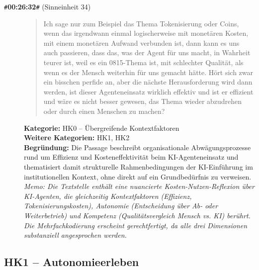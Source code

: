 \begin{description}
  \item[\texttt{\#}\textbf{00:26:32}\texttt{\#} (Sinneinheit 34)]
  \begin{quote}
  Ich sage nur zum Beispiel das Thema Tokenisierung oder Coins, wenn das irgendwann einmal logischerweise mit monetären Kosten, mit einem monetären Aufwand verbunden ist, dann kann es uns auch passieren, dass das, was der Agent für uns macht, in Wahrheit teurer ist, weil es ein 0815-Thema ist, mit schlechter Qualität, als wenn es der Mensch weiterhin für uns gemacht hätte. Hört sich zwar ein bisschen perfide an, aber die nächste Herausforderung wird dann werden, ist dieser Agenteneinsatz wirklich effektiv und ist er effizient und wäre es nicht besser gewesen, das Thema wieder abzudrehen oder durch einen Menschen zu machen?
  \end{quote}
  \textbf{Kategorie:} HK0 -- Übergreifende Kontextfaktoren\\
  \textbf{Weitere Kategorien:} HK1, HK2\\
  \textbf{Begr\"undung:} Die Passage beschreibt organisationale Abwägungsprozesse rund um Effizienz und Kosteneffektivität beim KI-Agenteneinsatz und thematisiert damit strukturelle Rahmenbedingungen der KI-Einführung im institutionellen Kontext, ohne direkt auf ein Grundbedürfnis zu verweisen.
  \\\textit{Memo: Die Textstelle enthält eine nuancierte Kosten-Nutzen-Reflexion über KI-Agenten, die gleichzeitig Kontextfaktoren (Effizienz, Tokenisierungskosten), Autonomie (Entscheidung über Ab- oder Weiterbetrieb) und Kompetenz (Qualitätsvergleich Mensch vs. KI) berührt. Die Mehrfachkodierung erscheint gerechtfertigt, da alle drei Dimensionen substanziell angesprochen werden.}
\end{description}
\medskip

\subsection*{HK1 -- Autonomieerleben}

